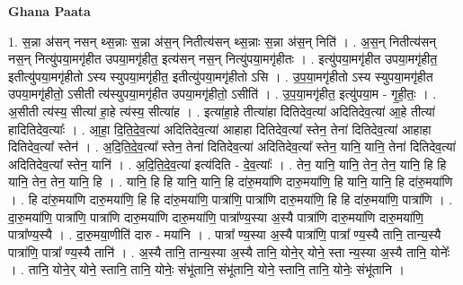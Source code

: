 \documentclass[17pt]{extarticle}
\begin{document}
\textbf{Ghana Paata } \newline

1. स॒न्ना अ॑सन् नसन् थ्स॒न्नाः स॒न्ना अ॑स॒न् नितीत्य॑सन् थ्स॒न्नाः स॒न्ना अ॑स॒न् निति॑ । . अ॒स॒न् नितीत्य॑सन् नस॒न् नित्यु॑पया॒मगृ॑हीत उपया॒मगृ॑हीत॒ इत्य॑सन् नस॒न् नित्यु॑पया॒मगृ॑हीतः । . इत्यु॑पया॒मगृ॑हीत उपया॒मगृ॑हीत॒ इतीत्यु॑पया॒मगृ॑हीतो ऽस्य स्युपया॒मगृ॑हीत॒ इतीत्यु॑पया॒मगृ॑हीतो ऽसि । . उ॒प॒या॒मगृ॑हीतो ऽस्य स्युपया॒मगृ॑हीत उपया॒मगृ॑हीतो॒ ऽसीती त्य॑स्युपया॒मगृ॑हीत उपया॒मगृ॑हीतो॒ ऽसीति॑ । . उ॒प॒या॒मगृ॑हीत॒ इत्यु॑पया॒म - गृ॒ही॒तः॒ । . अ॒सीती त्य॑स्य॒ सीत्या॑ हा॒हे त्य॑स्य॒ सीत्या॑ह । . इत्या॑हा॒हे तीत्या॑हा दितिदेव॒त्या॑ अदितिदेव॒त्या॑ आ॒हे तीत्या॑ हादितिदेव॒त्याः᳚ । . आ॒हा॒ दि॒ति॒दे॒व॒त्या॑ अदितिदेव॒त्या॑ आहाहा दितिदेव॒त्या᳚ स्तेन॒ तेना॑ दितिदेव॒त्या॑ आहाहा दितिदेव॒त्या᳚ स्तेन॑ । . अ॒दि॒ति॒दे॒व॒त्या᳚ स्तेन॒ तेना॑ दितिदेव॒त्या॑ अदितिदेव॒त्या᳚ स्तेन॒ यानि॒ यानि॒ तेना॑ दितिदेव॒त्या॑ अदितिदेव॒त्या᳚ स्तेन॒ यानि॑ । . अ॒दि॒ति॒दे॒व॒त्या॑ इत्य॑दिति - दे॒व॒त्याः᳚ । . तेन॒ यानि॒ यानि॒ तेन॒ तेन॒ यानि॒ हि हि यानि॒ तेन॒ तेन॒ यानि॒ हि । . यानि॒ हि हि यानि॒ यानि॒ हि दा॑रु॒मया॑णि दारु॒मया॑णि॒ हि यानि॒ यानि॒ हि दा॑रु॒मया॑णि । . हि दा॑रु॒मया॑णि दारु॒मया॑णि॒ हि हि दा॑रु॒मया॑णि॒ पात्रा॑णि॒ पात्रा॑णि दारु॒मया॑णि॒ हि हि दा॑रु॒मया॑णि॒ पात्रा॑णि । . दा॒रु॒मया॑णि॒ पात्रा॑णि॒ पात्रा॑णि दारु॒मया॑णि दारु॒मया॑णि॒ पात्रा᳚ण्य॒स्या अ॒स्यै पात्रा॑णि दारु॒मया॑णि दारु॒मया॑णि॒ पात्रा᳚ण्य॒स्यै । . दा॒रु॒मया॒णीति॑ दारु - मया॑नि । . पात्रा᳚ ण्य॒स्या अ॒स्यै पात्रा॑णि॒ पात्रा᳚ ण्य॒स्यै तानि॒ तान्य॒स्यै पात्रा॑णि॒ पात्रा᳚ ण्य॒स्यै तानि॑ । . अ॒स्यै तानि॒ तान्य॒स्या अ॒स्यै तानि॒ योने॒र् योने॒ स्ता न्य॒स्या अ॒स्यै तानि॒ योनेः᳚ । . तानि॒ योने॒र् योने॒ स्तानि॒ तानि॒ योनेः॒ संभू॑तानि॒ संभू॑तानि॒ योने॒ स्तानि॒ तानि॒ योनेः॒ संभू॑तानि । \newline
\end{document}
